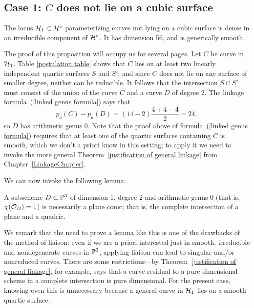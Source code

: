 \subsection{Case 1: $C$ does not lie on a cubic surface}

\begin{proposition}\label{mumford example H1}
The locus $\cH_1 \subset \cH^\circ$ parameterizing curves not lying on a cubic surface is dense in an irreducible component of  $\cH^\circ$. It has dimension 56, and is generically smooth.
\end{proposition} 
 
The proof of this proposition will occupy us for several pages. Let $C$ be curve in $\cH_1$. Table \ref{postulation table} shows that $C$ lies on at least two linearly independent quartic surfaces $S$ and $S'$; and since $C$ does not lie on any surface of smaller degree, neither can be reducible. It follows that the intersection $S \cap S'$ must consist of the union of the curve $C$ and a curve $D$ of degree 2. The linkage formula~(\ref{linked genus formula}) says that
$$
p_a(C) - p_{a}(D) = (14 - 2)\frac{4+4-4}{2} = 24,
$$
so $D$ has arithmetic genus 0. Note that the proof above of formula~(\ref{linked genus formula}) requires that at least one of the quartic surfaces containing $C$ is smooth, which we don't a priori know in this setting; to apply it we need to invoke the more general Theorem~\ref{justification of general linkage} from Chapter~\ref{LinkageChapter}.

We can now invoke the following lemma:

\begin{lemma}\label{conics}
A subscheme $D \subset \PP^3$ of dimension 1, degree 2 and arithmetic genus 0 (that is, $\chi(\cO_D) = 1$) is necessarily a plane conic; that is, the complete intersection of a plane and a quadric.
\end{lemma}

We remark that the need to prove a lemma like this is one of the drawbacks of the method of liaison: even if we are a priori interested just in smooth, irreducible and nondegenerate curves in $\PP^3$, applying liaison can lead to  singular and/or nonreduced curves. There are some restrictions---by Theorem~\ref{justification of general linkage}, for example, says that a curve residual to a pure-dimensional scheme in a complete intersection is pure dimensional. For the present case, knowing even this is unnecessary because  a general curve in $\cH_1$ lies on a smooth quartic surface.

